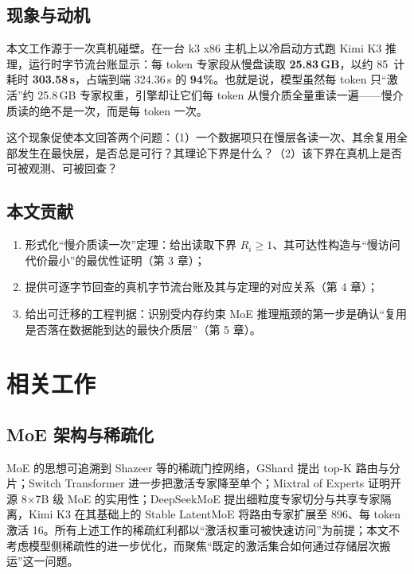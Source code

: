 \documentclass[11pt]{ctexart}
\begin{document}
\subsection{现象与动机}

本文工作源于一次真机碰壁。在一台 k3 x86 主机上以冷启动方式跑 Kimi K3 推理，运行时字节流台账显示：每 token 专家段从慢盘读取 \textbf{25.83\,GB}，以约 85\, 计耗时 \textbf{303.58\,s}，占端到端 324.36\,s 的 \textbf{94\%}\cite{ledger}。也就是说，模型虽然每 token 只“激活”约 25.8\,GB 专家权重，引擎却让它们每 token 从慢介质全量重读一遍——慢介质读的绝不是一次，而是每 token 一次。

这个现象促使本文回答两个问题：（1）一个数据项只在慢层各读一次、其余复用全部发生在最快层，是否总是可行？其理论下界是什么？（2）该下界在真机上是否可被观测、可被回查？

\subsection{本文贡献}

\begin{enumerate}
\item 形式化“慢介质读一次”定理：给出读取下界 $R_i\ge 1$、其可达性构造与“慢访问代价最小”的最优性证明（第 3 章）；
\item 提供可逐字节回查的真机字节流台账及其与定理的对应关系（第 4 章）；
\item 给出可迁移的工程判据：识别受内存约束 MoE 推理瓶颈的第一步是确认“复用是否落在数据能到达的最快介质层”（第 5 章）。
\end{enumerate}

\section{相关工作}

\subsection{MoE 架构与稀疏化}

MoE 的思想可追溯到 Shazeer 等的稀疏门控网络\cite{shazeer17}，GShard\cite{gshard} 提出 top-K 路由与分片；Switch Transformer\cite{switch} 进一步把激活专家降至单个；Mixtral of Experts\cite{mixtral} 证明开源 8$\times$7B 级 MoE 的实用性；DeepSeekMoE\cite{dsmoe} 提出细粒度专家切分与共享专家隔离，Kimi K3\cite{k3} 在其基础上的 Stable LatentMoE 将路由专家扩展至 896、每 token 激活 16。所有上述工作的稀疏红利都以“激活权重可被快速访问”为前提；本文不考虑模型侧稀疏性的进一步优化，而聚焦“既定的激活集合如何通过存储层次搬运”这一问题。
\end{document}

